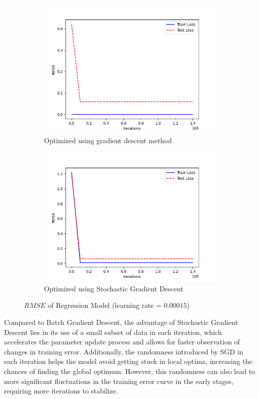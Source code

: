 \documentclass[a4paper, utf8]{ctexart}
\begin{document}
	\begin{figure}[htbp]
		\centering
		\begin{subfigure}{.48\textwidth}
			\centering
			\includegraphics[width=.95\linewidth]{./figure/1(a)3.png}
			\caption{Optimized using gradient descent method}
		\end{subfigure}
		\begin{subfigure}{.48\textwidth}
			\centering
			\includegraphics[width=.95\linewidth]{./figure/1(c).png}
			\caption{Optimized using Stochastic Gradient Descent}
		\end{subfigure}
		\caption{$RMSE$ of Regression Model (learning rate = $0.00015$)}
	\end{figure}
	
	Compared to Batch Gradient Descent, the advantage of Stochastic Gradient Descent lies in its use of a small subset of data in each iteration, which accelerates the parameter update process and allows for faster observation of changes in training error. Additionally, the randomness introduced by SGD in each iteration helps the model avoid getting stuck in local optima, increasing the chances of finding the global optimum. However, this randomness can also lead to more significant fluctuations in the training error curve in the early stages, requiring more iterations to stabilize.
	
\end{document}
